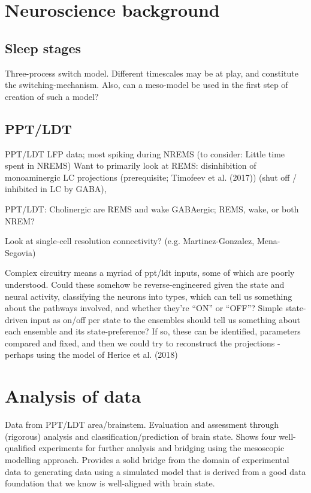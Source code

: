 \documentclass[mphil,deptreport,ianc]{infthesis} %
\begin{document}
\section{Neuroscience background}

\subsection{Sleep stages}
Three-process switch model. Different timescales may be at play, and constitute the switching-mechanism.
Also, can a meso-model be used in the first step of creation of such a model?

\subsection{PPT/LDT}
PPT/LDT LFP data; most spiking during NREMS
(to consider: Little time spent in NREMS)
Want to primarily look at REMS: disinhibition of monoaminergic LC projections (prerequisite; Timofeev et al. (2017)) (shut off / inhibited in LC by GABA), 

PPT/LDT:
Cholinergic are REMS and wake
GABAergic; REMS, wake, or both
NREM?

Look at single-cell resolution connectivity? (e.g. Martinez-Gonzalez, Mena-Segovia)

Complex circuitry means a myriad of ppt/ldt inputs, some of which are poorly understood.
Could these somehow be reverse-engineered given the state and neural activity, classifying the neurons into types, which can tell us something about the pathways involved, and whether they’re “ON” or “OFF”?
Simple state-driven input as on/off per state to the ensembles should tell us something about each ensemble and its state-preference? If so, these can be identified, parameters compared and fixed, and then we could try to reconstruct the projections - perhaps using the model of Herice et al. (2018)


\section{Analysis of data}
Data from PPT/LDT area/brainstem. Evaluation and assessment through (rigorous) analysis and classification/prediction of brain state. Shows four well-qualified experiments for further analysis and bridging using the mesoscopic modelling approach.
Provides a solid bridge from the domain of experimental data to generating data using a simulated model that is derived from a good data foundation that we know is well-aligned with brain state.
\end{document}
